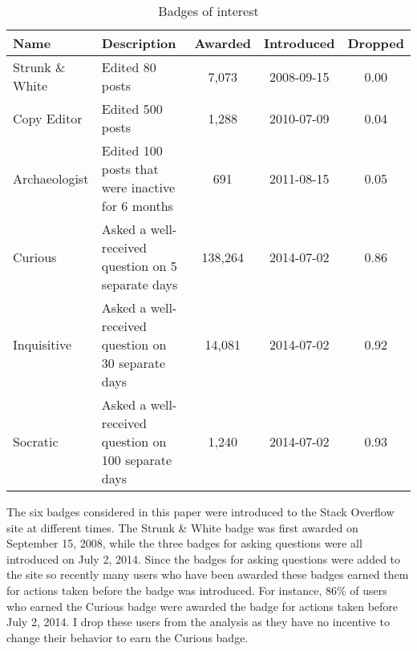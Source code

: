 \begin{table}
  \begin{threeparttable}
    \caption{Badges of interest}
    \label{tab:badges}
    \begin{tabular}{@{}llccc@{}}
      \toprule
      Name & Description & Awarded & Introduced & Dropped \\
      \midrule
      Strunk \& White & Edited 80 posts & 7,073 & 2008-09-15 & 0.00 \\
      Copy Editor & Edited 500 posts & 1,288 & 2010-07-09 & 0.04 \\
      Archaeologist & Edited 100 posts that were inactive for 6 months & 691 & 2011-08-15 & 0.05 \\
      Curious & Asked a well-received question on 5 separate days & 138,264 & 2014-07-02 & 0.86 \\
      Inquisitive & Asked a well-received question on 30 separate days & 14,081 & 2014-07-02 & 0.92 \\
      Socratic & Asked a well-received question on 100 separate days & 1,240 & 2014-07-02 & 0.93 \\
      \bottomrule
    \end{tabular}
    \begin{tablenotes}
    \item The six badges considered in this paper were introduced to the Stack Overflow site at different times. The Strunk \& White badge was first awarded on September 15, 2008, while the three badges for asking questions were all introduced on July 2, 2014. Since the badges for asking questions were added to the site so recently many users who have been awarded these badges earned them for actions taken before the badge was introduced. For instance, 86\% of users who earned the Curious badge were awarded the badge for actions taken before July 2, 2014. I drop these users from the analysis as they have no incentive to change their behavior to earn the Curious badge.
    \end{tablenotes}
  \end{threeparttable}
\end{table}
